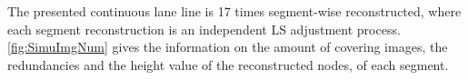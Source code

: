 \clearpage









The presented continuous lane line is 17 times segment-wise reconstructed, where each segment reconstruction is an independent LS adjustment process. \cref{fig:SimuImgNum} gives the information on the amount of covering images, the redundancies and the height value of the reconstructed nodes, of each segment.

